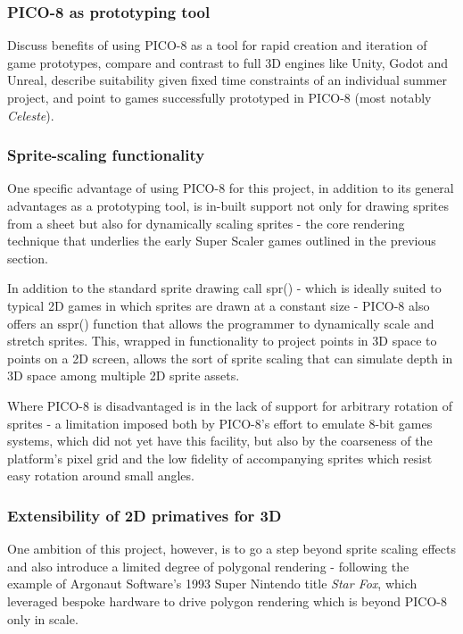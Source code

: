 \documentclass{article}
\begin{document}
\subsubsection*{PICO-8 as prototyping tool}
Discuss benefits of using PICO-8 as a tool for rapid creation and iteration of
game prototypes, compare and contrast to full 3D engines like Unity, Godot and Unreal,
describe suitability given fixed time constraints of an individual summer
project, and point to games successfully prototyped in PICO-8 (most notably
\textit{Celeste}).

\subsubsection*{Sprite-scaling functionality}
One specific advantage of using PICO-8 for this project, in addition to its general
advantages as a prototyping tool, is in-built support not only for drawing sprites
from a sheet but also for dynamically scaling sprites - the core rendering technique
that underlies the early Super Scaler games outlined in the previous section.

In addition to the standard sprite drawing call spr() - which is ideally suited to
typical 2D games in which sprites are drawn at a constant size - PICO-8 also offers
an sspr() function that allows the programmer to dynamically scale and stretch sprites.
This, wrapped in functionality to project points in 3D space to points on a 2D screen,
allows the sort of sprite scaling that can simulate depth in 3D space among
multiple 2D sprite assets.

Where PICO-8 is disadvantaged is in the lack of support for arbitrary rotation of sprites -
a limitation imposed both by PICO-8's effort to emulate 8-bit games systems, which did not yet
have this facility, but also by the coarseness of the platform's pixel grid and the low fidelity
of accompanying sprites which resist easy rotation around small angles.

\subsubsection*{Extensibility of 2D primatives for 3D}
One ambition of this project, however, is to go a step beyond sprite scaling effects
and also introduce a limited degree of polygonal rendering - following the example of
Argonaut Software's 1993 Super Nintendo title \textit{Star Fox}, which leveraged bespoke
hardware to drive polygon rendering which is beyond PICO-8 only in scale.
\end{document}
